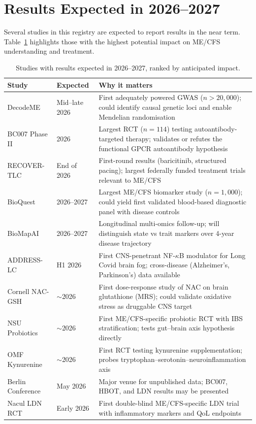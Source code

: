 \section{Results Expected in 2026--2027}
\label{sec:registry-upcoming}

Several studies in this registry are expected to report results in the near
term.  Table~\ref{tab:registry-upcoming} highlights those with the highest
potential impact on ME/CFS understanding and treatment.

\begin{table}[htbp]
\centering
\small
\caption{Studies with results expected in 2026--2027, ranked by anticipated
impact.}
\label{tab:registry-upcoming}
\begin{tabular}{@{}p{3.0cm}p{2.0cm}p{7.3cm}@{}}
\toprule
\textbf{Study} & \textbf{Expected} & \textbf{Why it matters} \\
\midrule
DecodeME & Mid--late 2026 &
    First adequately powered GWAS ($n>20{,}000$); could identify
    causal genetic loci and enable Mendelian randomisation \\
BC007 Phase II & 2026 &
    Largest RCT ($n=114$) testing autoantibody-targeted therapy;
    validates or refutes the functional GPCR autoantibody hypothesis \\
RECOVER-TLC & End of 2026 &
    First-round results (baricitinib, structured pacing); largest
    federally funded treatment trials relevant to ME/CFS \\
BioQuest & 2026--2027 &
    Largest ME/CFS biomarker study ($n=1{,}000$); could yield first
    validated blood-based diagnostic panel with disease controls \\
BioMapAI & 2026--2027 &
    Longitudinal multi-omics follow-up; will distinguish state vs
    trait markers over 4-year disease trajectory \\
ADDRESS-LC & H1 2026 &
    First CNS-penetrant NF-$\kappa$B modulator for Long Covid brain fog;
    cross-disease (Alzheimer's, Parkinson's) data available \\
Cornell NAC-GSH & $\sim$2026 &
    First dose-response study of NAC on brain glutathione (MRS);
    could validate oxidative stress as druggable CNS target \\
NSU Probiotics & $\sim$2026 &
    First ME/CFS-specific probiotic RCT with IBS stratification;
    tests gut--brain axis hypothesis directly \\
OMF Kynurenine & $\sim$2026 &
    First RCT testing kynurenine supplementation; probes
    tryptophan--serotonin--neuroinflammation axis \\
Berlin Conference & May 2026 &
    Major venue for unpublished data; BC007, HBOT, and LDN results
    may be presented \\
Nacul LDN RCT & Early 2026 &
    First double-blind ME/CFS-specific LDN trial with inflammatory
    markers and QoL endpoints \\
\bottomrule
\end{tabular}
\end{table}

